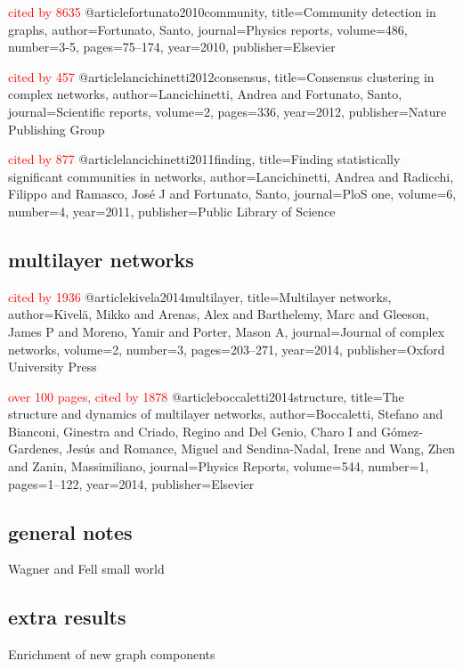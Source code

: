 \textcolor{red}{cited by 8635}
@article{fortunato2010community,
  title={Community detection in graphs},
  author={Fortunato, Santo},
  journal={Physics reports},
  volume={486},
  number={3-5},
  pages={75--174},
  year={2010},
  publisher={Elsevier}
}

\textcolor{red}{cited by 457}
@article{lancichinetti2012consensus,
  title={Consensus clustering in complex networks},
  author={Lancichinetti, Andrea and Fortunato, Santo},
  journal={Scientific reports},
  volume={2},
  pages={336},
  year={2012},
  publisher={Nature Publishing Group}
}

\textcolor{red}{cited by 877}
@article{lancichinetti2011finding,
  title={Finding statistically significant communities in networks},
  author={Lancichinetti, Andrea and Radicchi, Filippo and Ramasco, Jos{\'e} J and Fortunato, Santo},
  journal={PloS one},
  volume={6},
  number={4},
  year={2011},
  publisher={Public Library of Science}
}

\subsection{multilayer networks}
\textcolor{red}{cited by 1936}
@article{kivela2014multilayer,
  title={Multilayer networks},
  author={Kivel{\"a}, Mikko and Arenas, Alex and Barthelemy, Marc and Gleeson, James P and Moreno, Yamir and Porter, Mason A},
  journal={Journal of complex networks},
  volume={2},
  number={3},
  pages={203--271},
  year={2014},
  publisher={Oxford University Press}
}

\textcolor{red}{over 100 pages, cited by 1878}
@article{boccaletti2014structure,
  title={The structure and dynamics of multilayer networks},
  author={Boccaletti, Stefano and Bianconi, Ginestra and Criado, Regino and Del Genio, Charo I and G{\'o}mez-Gardenes, Jes{\'u}s and Romance, Miguel and Sendina-Nadal, Irene and Wang, Zhen and Zanin, Massimiliano},
  journal={Physics Reports},
  volume={544},
  number={1},
  pages={1--122},
  year={2014},
  publisher={Elsevier}
}


\subsection{general notes}
Wagner and Fell small world

\subsection{extra results}
Enrichment of new graph components


